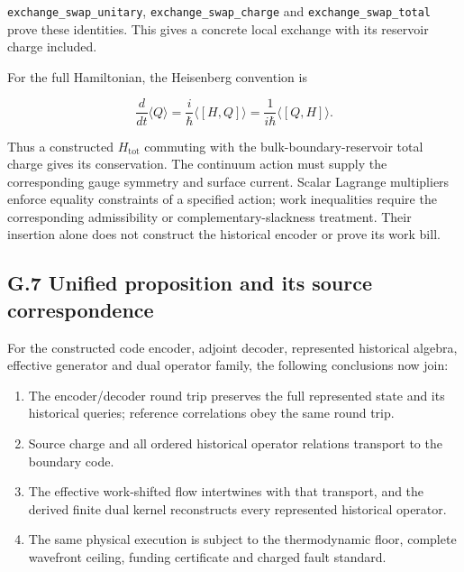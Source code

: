 \documentclass[
]{article}
\providecommand{\tightlist}{%
  \setlength{\itemsep}{0pt}\setlength{\parskip}{0pt}}
\begin{document}
\texttt{e\allowbreak{}x\allowbreak{}c\allowbreak{}h\allowbreak{}a\allowbreak{}n\allowbreak{}g\allowbreak{}e\allowbreak{}\_\allowbreak{}s\allowbreak{}w\allowbreak{}a\allowbreak{}p\allowbreak{}\_\allowbreak{}u\allowbreak{}n\allowbreak{}i\allowbreak{}t\allowbreak{}a\allowbreak{}r\allowbreak{}y},
\texttt{e\allowbreak{}x\allowbreak{}c\allowbreak{}h\allowbreak{}a\allowbreak{}n\allowbreak{}g\allowbreak{}e\allowbreak{}\_\allowbreak{}s\allowbreak{}w\allowbreak{}a\allowbreak{}p\allowbreak{}\_\allowbreak{}c\allowbreak{}h\allowbreak{}a\allowbreak{}r\allowbreak{}g\allowbreak{}e}
and
\texttt{e\allowbreak{}x\allowbreak{}c\allowbreak{}h\allowbreak{}a\allowbreak{}n\allowbreak{}g\allowbreak{}e\allowbreak{}\_\allowbreak{}s\allowbreak{}w\allowbreak{}a\allowbreak{}p\allowbreak{}\_\allowbreak{}t\allowbreak{}o\allowbreak{}t\allowbreak{}a\allowbreak{}l}
prove these identities. This gives a concrete local exchange with its
reservoir charge included.

For the full Hamiltonian, the Heisenberg convention is

\[
\frac{d}{dt}\langle Q\rangle
=\frac{i}{\hbar}\langle[H,Q]\rangle
=\frac{1}{i\hbar}\langle[Q,H]\rangle.
\]

Thus a constructed \(H_{\mathrm{tot}}\) commuting with the
bulk-boundary-reservoir total charge gives its conservation. The
continuum action must supply the corresponding gauge symmetry and
surface current. Scalar Lagrange multipliers enforce equality
constraints of a specified action; work inequalities require the
corresponding admissibility or complementary-slackness treatment. Their
insertion alone does not construct the historical encoder or prove its
work bill.

\subsection{G.7 Unified proposition and its source
correspondence}\label{g.7-unified-proposition-and-its-source-correspondence}

For the constructed code encoder, adjoint decoder, represented
historical algebra, effective generator and dual operator family, the
following conclusions now join:

\begin{enumerate}
\def\labelenumi{\arabic{enumi}.}
\tightlist
\item
  The
  e\allowbreak{}n\allowbreak{}c\allowbreak{}o\allowbreak{}d\allowbreak{}e\allowbreak{}r\allowbreak{}/\allowbreak{}d\allowbreak{}e\allowbreak{}c\allowbreak{}o\allowbreak{}d\allowbreak{}e\allowbreak{}r
  round trip preserves the full represented state and its historical
  queries; reference correlations obey the same round trip.
\item
  Source charge and all ordered historical operator relations transport
  to the boundary code.
\item
  The effective work-shifted flow intertwines with that transport, and
  the derived finite dual kernel reconstructs every represented
  historical operator.
\item
  The same physical execution is subject to the thermodynamic floor,
  complete wavefront ceiling, funding certificate and charged fault
  standard.
\end{enumerate}
\end{document}
